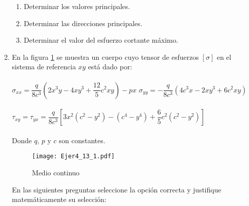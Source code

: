 \documentclass[../notas medios.tex]{subfiles}
\begin{document}
\begin{enumerate}
	\begin{enumerate}
		\item Determinar los valores principales.
		\item Determinar las direcciones principales.
		\item Determinar el valor del esfuerzo cortante máximo.
	\end{enumerate}
\item \label{punto13} En la figura \ref{continuo} se muestra un cuerpo cuyo
tensor de esfuerzos  $[\sigma]$  en el sistema de referencia $xy$ est\'a dado  por:\\\\
	$\sigma_{xx} = \dfrac{q}{8c^3} (2x^3y - 4xy^3 + \dfrac{12}{5}c^2xy) - px$ \hspace{30mm} $\sigma_{yy} = - \dfrac{q}{8c^3} (4c^3x - 2xy^3 + 6c^2xy)$ \\\\
	$\tau_{xy} = \tau_{yx} = \dfrac{q}{8c^3} [3x^2(c^2 - y^2)- (c^4 - y^4) + \dfrac{6}{5}c^2(c^2 - y^2)] $\\\\
	Donde $q$, $p$ y $c$ son constantes.
	\begin{figure}[H]
		\centering
		\texttt{[image: Ejer4\_13\_1.pdf]} 
		\caption{Medio continuo}
		\label{continuo}
	\end{figure}
	En las siguientes preguntas seleccione la opci\'on correcta y justifique matem\'aticamente su selecci\'on:
	\begin{enumerate}
	  

\end{enumerate}
\end{enumerate}
\end{document}

